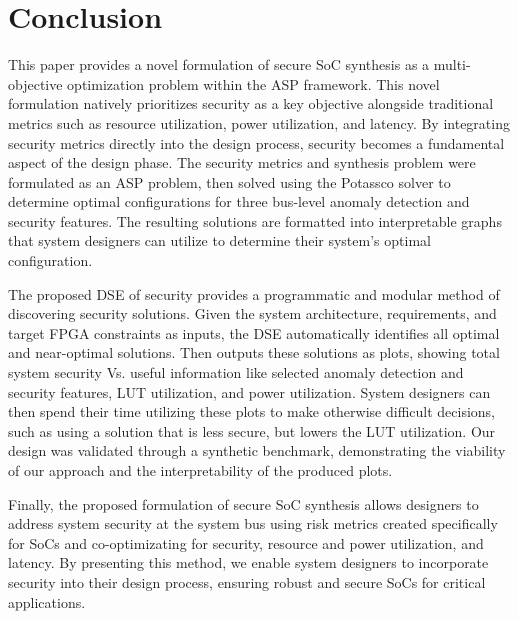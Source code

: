 \section{Conclusion} 
\label{sec:conclusion}

This paper provides a novel formulation of secure SoC synthesis as a multi-objective optimization problem within the ASP framework. This novel formulation natively prioritizes security as a key objective alongside traditional metrics such as resource utilization, power utilization, and latency. By integrating security metrics directly into the design process, security becomes a fundamental aspect of the design phase. The security metrics and synthesis problem were formulated as an ASP problem, then solved using the Potassco solver to determine optimal configurations for three bus-level anomaly detection and security features. The resulting solutions are formatted into interpretable graphs that system designers can utilize to determine their system's optimal configuration. 

The proposed DSE of security provides a programmatic and modular method of discovering security solutions. Given the system architecture, requirements, and target FPGA constraints as inputs, the DSE automatically identifies all optimal and near-optimal solutions. Then outputs these solutions as plots, showing total system security Vs. useful information like selected anomaly detection and security features, LUT utilization, and power utilization. System designers can then spend their time utilizing these plots to make otherwise difficult decisions, such as using a solution that is less secure, but lowers the LUT utilization. 
Our design was validated through a synthetic benchmark, demonstrating the viability of our approach and the interpretability of the produced plots. 

Finally, the proposed formulation of secure SoC synthesis allows designers to address system security at the system bus using risk metrics created specifically for SoCs and co-optimizating for security, resource and power utilization, and latency. By presenting this method, we enable system designers to incorporate security into their design process, ensuring robust and secure SoCs for critical applications.


